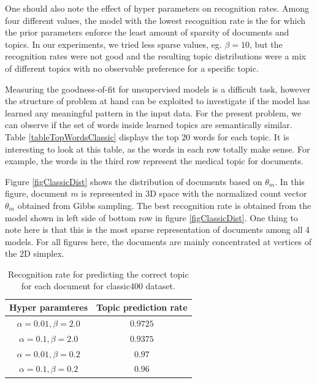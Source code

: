 \documentclass[twoside,12pt]{article}
\begin{document}
One should also note the effect of hyper parameters on recognition rates. Among four different values, the model with the lowest recognition rate is the for which the prior parameters enforce the least amount of sparsity of documents and topics. In our experiments, we tried less sparse values, eg. $\beta=10$, but the recognition rates were not good and the resulting topic distributions were a mix of different topics with no observable preference for a specific topic.

Measuring the goodness-of-fit for unsupervised models is a difficult task, however the structure of problem at hand can be exploited to investigate if the model has learned any meaningful pattern in the input data. For the present problem, we can observe if the set of words inside learned topics are semantically similar. Table \ref{tableTopWordsClassic} displays the top 20 words for each topic. It is interesting to look at this table, as the words in each row totally make sense. For example, the words in the third row represent the medical topic for documents.

Figure \ref{figClassicDist} shows the distribution of documents based on $\theta_m$. In this figure, document $m$ is represented in 3D space with the normalized count vector $\theta_m$ obtained from Gibbs sampling. The best recognition rate is obtained from the model shown in left side of bottom row in figure \ref{figClassicDist}. One thing to note here is that this is the most sparse representation of documents among all 4 models. For all figures here, the documents are mainly concentrated at vertices of the 2D simplex. 


\begin{table}[!]
\begin{center}
\begin{tabular}{| c | c |} 
\hline
\textbf{Hyper paramteres}& \textbf{Topic prediction rate}  \\ \hline

$\alpha=0.01,\beta=2.0$ & $0.9725$ \\ \hline
$\alpha=0.1,\beta=2.0$ &  $0.9375$ \\ \hline
$\alpha=0.01,\beta=0.2$ & $0.97$ \\ \hline
$\alpha=0.1,\beta=0.2$ & $0.96$ \\ \hline
 
\end{tabular}
\caption{Recognition rate for predicting the correct topic for each document for classic400 dataset.}
\label{tableClssicRecognition}
\end{center}
\end{table}
\end{document}
